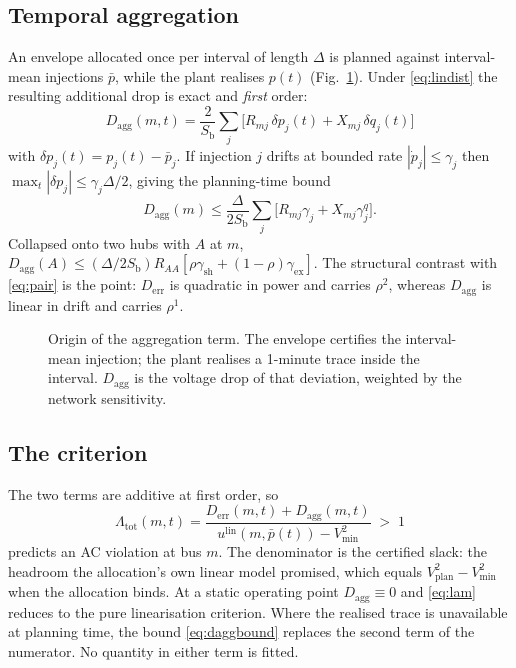 \documentclass[lettersize,journal]{IEEEtran}
\newcommand{\Derr}{D_{\mathrm{err}}}
\newcommand{\Dagg}{D_{\mathrm{agg}}}
\newcommand{\Lamt}{\Lambda_{\mathrm{tot}}}
\newcommand{\Sb}{S_{\mathrm{b}}}
\begin{document}
\subsection{Temporal aggregation}\label{sec:agg}
An envelope allocated once per interval of length $\Delta$ is planned against
interval-mean injections $\bar p$, while the plant realises $p(t)$
(Fig.~\ref{fig:timing}). Under \eqref{eq:lindist} the resulting additional drop
is exact and \emph{first} order:
\begin{equation}\label{eq:dagg}
\Dagg(m,t)=\frac{2}{\Sb}\sum_j\bigl[R_{mj}\,\delta p_j(t)+X_{mj}\,\delta q_j(t)\bigr]
\end{equation}
with $\delta p_j(t)=p_j(t)-\bar p_j$. If injection $j$ drifts at bounded rate
$|\dot p_j|\le\gamma_j$ then $\max_t|\delta p_j|\le\gamma_j\Delta/2$, giving the
planning-time bound
\begin{equation}\label{eq:daggbound}
\Dagg(m)\le\frac{\Delta}{2\Sb}\sum_j\bigl[R_{mj}\gamma_j+X_{mj}\gamma^{q}_j\bigr].
\end{equation}
Collapsed onto two hubs with $A$ at $m$,
$\Dagg(A)\le(\Delta/2\Sb)R_{AA}[\rho\gamma_{\mathrm{sh}}+(1-\rho)\gamma_{\mathrm{ex}}]$.
The structural contrast with \eqref{eq:pair} is the point: $\Derr$ is quadratic
in power and carries $\rho^{2}$, whereas $\Dagg$ is linear in drift and carries
$\rho^{1}$.

\begin{figure}[!t]\centering
\resizebox{0.96\columnwidth}{!}{}
\caption{Origin of the aggregation term. The envelope certifies the
interval-mean injection; the plant realises a 1-minute trace inside the
interval. $\Dagg$ is the voltage drop of that deviation, weighted by the
network sensitivity.}
\label{fig:timing}
\end{figure}

\subsection{The criterion}
The two terms are additive at first order, so
\begin{equation}\label{eq:lam}
\Lamt(m,t)=\frac{\Derr(m,t)+\Dagg(m,t)}
{u^{\mathrm{lin}}(m,\bar p(t))-V_{\min}^{2}}\;>\;1
\end{equation}
predicts an AC violation at bus $m$. The denominator is the certified slack:
the headroom the allocation's own linear model promised, which equals
$V_{\mathrm{plan}}^{2}-V_{\min}^{2}$ when the allocation binds. At a static
operating point $\Dagg\equiv 0$ and \eqref{eq:lam} reduces to the pure
linearisation criterion. Where the realised trace is unavailable at planning
time, the bound \eqref{eq:daggbound} replaces the second term of the
numerator. No quantity in either term is fitted.
\end{document}
